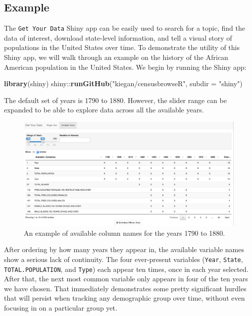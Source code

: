 \documentclass[11pt,]{article}
\newenvironment{Shaded}{\begin{snugshade}}{\end{snugshade}}
\newcommand{\KeywordTok}[1]{\textcolor[rgb]{0.13,0.29,0.53}{\textbf{{#1}}}}
\newcommand{\DataTypeTok}[1]{\textcolor[rgb]{0.13,0.29,0.53}{{#1}}}
\newcommand{\StringTok}[1]{\textcolor[rgb]{0.31,0.60,0.02}{{#1}}}
\newcommand{\NormalTok}[1]{{#1}}
\begin{document}
\subsection{Example}

The \texttt{Get\ Your\ Data} Shiny app can be easily used to search for
a topic, find the data of interest, download state-level information,
and tell a visual story of populations in the United States over time.
To demonstrate the utility of this Shiny app, we will walk through an
example on the history of the African American population in the United
States. We begin by running the Shiny app:

\begin{Shaded}
\begin{Highlighting}[]
\KeywordTok{library}\NormalTok{(shiny)}
\NormalTok{shiny::}\KeywordTok{runGitHub}\NormalTok{(}\StringTok{"kiegan/censusbrowseR"}\NormalTok{, }\DataTypeTok{subdir =} \StringTok{"shiny"}\NormalTok{)}
\end{Highlighting}
\end{Shaded}

The default set of years is 1790 to 1880. However, the slider range can
be expanded to be able to explore data across all the available years.

\begin{figure}[htbp]
\centering
\includegraphics{./figures/app-sshot-multiple-years.png}
\caption{An example of available column names for the years 1790 to
1880.}
\end{figure}

After ordering by how many years they appear in, the available variable
names show a serious lack of continuity. The four ever-present variables
(\texttt{Year}, \texttt{State}, \texttt{TOTAL.POPULATION}, and
\texttt{Type}) each appear ten times, once in each year selected. After
that, the next most common variable only appears in four of the ten
years we have chosen. That immediately demonstrates some pretty
significant hurdles that will persist when tracking any demographic
group over time, without even focusing in on a particular group yet.
\end{document}
